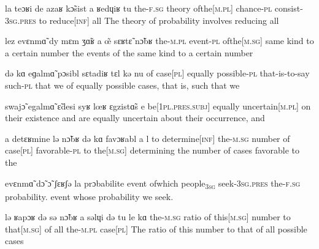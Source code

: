 
              {la teɔʁi de azaʁ {k\~{ɔ}sist\liaison} a ʁedɥiʁ tu}
              {the-\textsc{f}.\textsc{sg} theory {of{\textunderscore}the[\textsc{m}.\textsc{pl}]} chance-\textsc{pl} consist-3\textsc{sg}.\textsc{pres} to {reduce[\textsc{inf}]} all}
              {The theory of probability involves  reducing all}

              {{lez\liaison} evɛnm\~{ɑ} dy mɛm {ʒ\~{ɑ}ʁ\liaison} a \~{œ} sɛʁt\~{ɛ} n\~{ɔ}bʁ}
              {the-\textsc{m}.\textsc{pl} event-\textsc{pl} {of{\textunderscore}the[\textsc{m}.\textsc{sg}]} same kind to a certain number}
              {the events of the same kind to a certain number}

              {də kɑ eɡalm\~{ɑ} pɔsibl sɛtadiʁ tɛl kə nu}
              {of {case[\textsc{pl}]} equally possible-\textsc{pl} that-is-to-say such-\textsc{pl} that we}
              {of equally possible cases, that is, such that we}

              {swaj\~{ɔ} egalm\~{ɑ} \~{ɛ}desi syʁ {lœʁ\liaison} ɛgzist\~{ɑ}s e}
              {{be[1\textsc{pl}.\textsc{pres}.\textsc{subj}]} equally {uncertain[\textsc{m}.\textsc{pl}]} on their existence and}
              {are equally uncertain about their occurrence, and}

              {a detɛʁmine lə n\~{ɔ}bʁ də kɑ {favɔʁabl\liaison} a {l{\liaison}}}
              {to {determine[\textsc{inf}]} the-\textsc{m}.\textsc{sg} number of {case[\textsc{pl}]} favorable-\textsc{pl} to {the[\textsc{m}.\textsc{sg}]}}
              {determining the number of cases favorable to the}

              {evɛnm\~{ɑ} d\~{ɔ} \~{ɔ} ʃɛʁʃə la prɔbabilite}
              {event of{\textunderscore}which {people\textsubscript{3\textsc{sg}}} seek-3\textsc{sg}.\textsc{pres} {the-\textsc{f}.\textsc{sg}} probability.}
              {event whose probability we seek.}

              {lə ʁapɔʁ də sə {n\~{ɔ}bʁ{\liaison}} a səlɥi də tu le kɑ}
              {the-\textsc{m}.\textsc{sg} ratio of {this[\textsc{m}.\textsc{sg}]} number to {that[\textsc{m}.\textsc{sg}]} of all {the-\textsc{m}.\textsc{pl}} {case[\textsc{pl}]}}
              {The ratio of this number to that of all possible cases}

